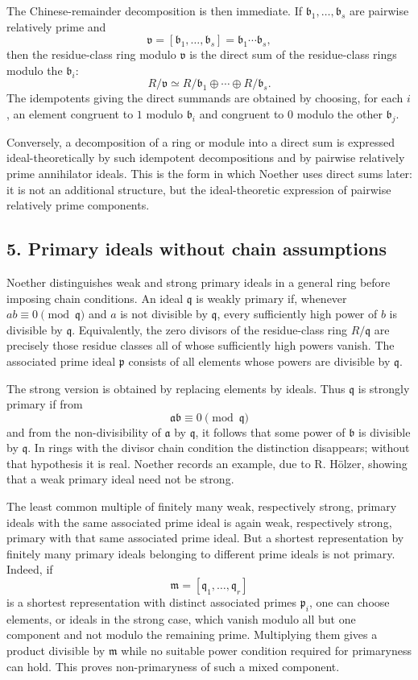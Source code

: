 \documentclass[11pt]{article}
\begin{document}
The Chinese-remainder decomposition is then immediate. If $\mathfrak b_1,
\ldots,\mathfrak b_s$ are pairwise relatively prime and
\[
  \mathfrak v=[\mathfrak b_1,\ldots,\mathfrak b_s]=\mathfrak b_1\cdots\mathfrak b_s,
\]
then the residue-class ring modulo $\mathfrak v$ is the direct sum of the residue-class rings modulo the $\mathfrak b_i$:
\[
  R/\mathfrak v \simeq R/\mathfrak b_1\oplus\cdots\oplus R/\mathfrak b_s.
\]
The idempotents giving the direct summands are obtained by choosing, for each $i$, an element congruent to $1$ modulo $\mathfrak b_i$ and congruent to $0$ modulo the other $\mathfrak b_j$.

Conversely, a decomposition of a ring or module into a direct sum is expressed ideal-theoretically by such idempotent decompositions and by pairwise relatively prime annihilator ideals. This is the form in which Noether uses direct sums later: it is not an additional structure, but the ideal-theoretic expression of pairwise relatively prime components.

\subsection{5. Primary ideals without chain assumptions}

Noether distinguishes weak and strong primary ideals in a general ring before imposing chain conditions. An ideal $\mathfrak q$ is weakly primary if, whenever $ab\equiv0\pmod{\mathfrak q}$ and $a$ is not divisible by $\mathfrak q$, every sufficiently high power of $b$ is divisible by $\mathfrak q$. Equivalently, the zero divisors of the residue-class ring $R/\mathfrak q$ are precisely those residue classes all of whose sufficiently high powers vanish. The associated prime ideal $\mathfrak p$ consists of all elements whose powers are divisible by $\mathfrak q$.

The strong version is obtained by replacing elements by ideals. Thus $\mathfrak q$ is strongly primary if from
\[
  \mathfrak a\mathfrak b\equiv0\pmod{\mathfrak q}
\]
and from the non-divisibility of $\mathfrak a$ by $\mathfrak q$, it follows that some power of $\mathfrak b$ is divisible by $\mathfrak q$. In rings with the divisor chain condition the distinction disappears; without that hypothesis it is real. Noether records an example, due to R. Hölzer, showing that a weak primary ideal need not be strong.

The least common multiple of finitely many weak, respectively strong, primary ideals with the same associated prime ideal is again weak, respectively strong, primary with that same associated prime ideal. But a shortest representation by finitely many primary ideals belonging to different prime ideals is not primary. Indeed, if
\[
  \mathfrak m=[\mathfrak q_1,
\ldots,\mathfrak q_r]
\]
is a shortest representation with distinct associated primes $\mathfrak p_i$, one can choose elements, or ideals in the strong case, which vanish modulo all but one component and not modulo the remaining prime. Multiplying them gives a product divisible by $\mathfrak m$ while no suitable power condition required for primaryness can hold. This proves non-primaryness of such a mixed component.
\end{document}
